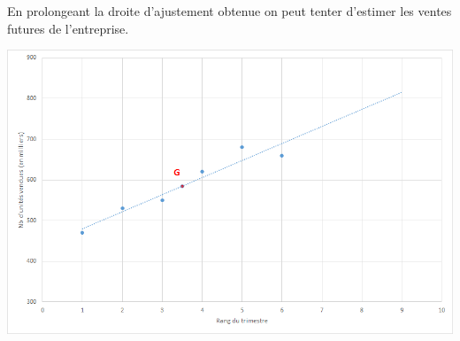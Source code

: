 \begin{myex}
	
	En prolongeant la droite d'ajustement obtenue on peut tenter d'estimer les ventes futures de l'entreprise.
	
	\begin{center}
		\includegraphics[scale =0.7]{./img/graph3}		
	\end{center}
		
\end{myex}